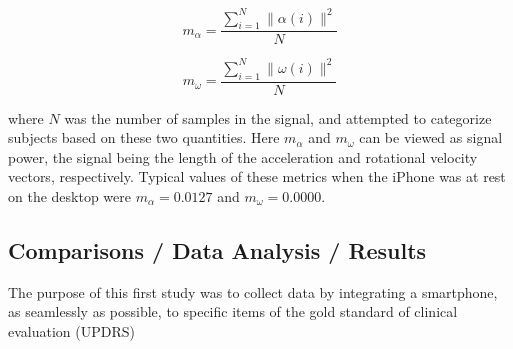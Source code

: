 \begin{equation}
m_{\alpha} = \frac{\sum_{i=1}^{N} \|\alpha(i)\|^{2} }{N}
\end{equation}

\begin{equation}
m_{\omega} = \frac{\sum_{i=1}^{N} \|\omega(i)\|^{2} }{N}
\end{equation}

where $N$ was the number of samples in the signal, and attempted to categorize subjects based on these two quantities. Here $m_{\alpha}$ and $m_{\omega}$ can be viewed as signal power, the signal being the length of the acceleration and rotational velocity vectors, respectively. Typical values of these metrics when the iPhone was at rest on the desktop were $m_{\alpha}=0.0127$ and  $m_{\omega}=0.0000$.

\subsection{Comparisons / Data Analysis / Results}
\label{subsec:SmartCT1Results}
The purpose of this first study was to collect data by integrating a smartphone, as seamlessly as possible, to specific items of the gold standard of clinical evaluation (\gls{UPDRS})

